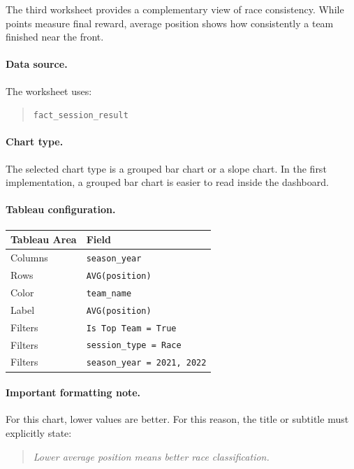 \documentclass[12pt,a4paper]{article}
\begin{document}
	The third worksheet provides a complementary view of race consistency.
	While points measure final reward, average position shows how consistently a team finished near the front.
	
	\paragraph{Data source.}
	The worksheet uses:
	
	\begin{quote}
		\texttt{fact\_session\_result}
	\end{quote}
	
	\paragraph{Chart type.}
	The selected chart type is a grouped bar chart or a slope chart.
	In the first implementation, a grouped bar chart is easier to read inside the dashboard.
	
	\paragraph{Tableau configuration.}
	
	\begin{longtable}{p{5cm} p{8cm}}
		\toprule
		\textbf{Tableau Area} & \textbf{Field} \\
		\midrule
		Columns & \texttt{season\_year} \\
		Rows & \texttt{AVG(position)} \\
		Color & \texttt{team\_name} \\
		Label & \texttt{AVG(position)} \\
		Filters & \texttt{Is Top Team = True} \\
		Filters & \texttt{session\_type = Race} \\
		Filters & \texttt{season\_year = 2021, 2022} \\
		\bottomrule
	\end{longtable}
	
	\paragraph{Important formatting note.}
	For this chart, lower values are better.
	For this reason, the title or subtitle must explicitly state:
	
	\begin{quote}
		\textit{Lower average position means better race classification.}
	\end{quote}
	
\end{document}
